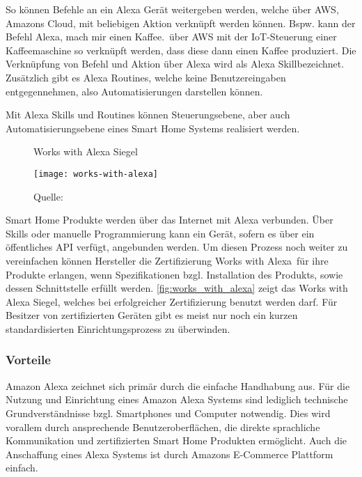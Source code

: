 So können Befehle an ein Alexa Gerät weitergeben werden, welche über \ac{AWS}, Amazons Cloud, mit beliebigen Aktion verknüpft werden können.
Bspw. kann der Befehl \glqq Alexa, mach mir einen Kaffee.\grqq \ über \ac{AWS} mit der \ac{IoT}-Steuerung einer Kaffeemaschine so verknüpft werden, dass diese dann einen Kaffee produziert.
Die Verknüpfung von Befehl und Aktion über Alexa wird als \glqq Alexa Skill\grqq bezeichnet.
Zusätzlich gibt es \glqq Alexa Routines\grqq, welche keine Benutzereingaben entgegennehmen, also Automatisierungen darstellen können.

Mit Alexa Skills und Routines können Steuerungsebene, aber auch Automatisierungsebene eines Smart Home Systems realisiert werden.

\begin{wrapfigure}{r}{0.35\textwidth}
	\centering
	\caption{Works with Alexa Siegel}
	\texttt{[image: works-with-alexa]}
	\caption*{\footnotesize{Quelle: }}
	\label{fig:works_with_alexa}
\end{wrapfigure}

Smart Home Produkte werden über das Internet mit Alexa verbunden.
Über Skills oder manuelle Programmierung kann ein Gerät, sofern es über ein öffentliches \ac{API} verfügt, angebunden werden.
Um diesen Prozess noch weiter zu vereinfachen können Hersteller die Zertifizierung \glqq Works with Alexa\grqq \ für ihre Produkte erlangen, wenn Spezifikationen bzgl. Installation des Produkts, sowie dessen Schnittstelle erfüllt werden.
\autoref{fig:works_with_alexa} zeigt das Works with Alexa Siegel, welches bei erfolgreicher Zertifizierung benutzt werden darf.
Für Besitzer von zertifizierten Geräten gibt es meist nur noch ein kurzen standardisierten Einrichtungsprozess zu überwinden.


\subsubsection{Vorteile}

Amazon Alexa zeichnet sich primär durch die einfache Handhabung aus.
Für die Nutzung und Einrichtung eines Amazon Alexa Systems sind lediglich technische Grundverständnisse bzgl. Smartphones und Computer notwendig.
Dies wird vorallem durch ansprechende Benutzeroberflächen, die direkte sprachliche Kommunikation und zertifizierten Smart Home Produkten ermöglicht.
Auch die Anschaffung eines Alexa Systems ist durch Amazons E-Commerce Plattform einfach.

